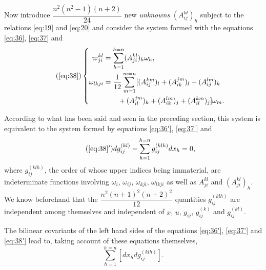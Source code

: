 \documentclass[leqno,12pt]{article}
\theoremstyle{shape1}
\theoremstyle{shape0}
\theoremstyle{shape2}
\theoremstyle{definition}
\begin{document}
Now introduce $\dfrac{n^{2}(n^{2}-1)(n+2)}{24}$ new \emph{unknowns} $(A^{kl}_{ij})_{h}$ subject to the relations \eqref{eq:19} and \eqref{eq:20} and consider the system formed with the equations \eqref{eq:36}, \eqref{eq:37} and
\begin{equation}
  \label{eq:38a}\tag{\ref{eq:38}}
  \left\{
    \begin{aligned}
      \varpi^{kl}_{ji}&=\sum_{h=1}^{h=n}(A^{kl}_{ji})_{h}\omega_{h},\\
      \omega_{lkji}&=\frac{1}{12}\sum_{m=1}^{m=n}[(A^{km}_{ij})_{l}+(A^{jm}_{ik})_{l}+(A^{lm}_{ij})_{k}\\
      &\qquad+(A^{jm}_{il})_{k}+(A^{lm}_{ik})_{j}+(A^{km}_{il})_{j}]\omega_{m}.
    \end{aligned}
  \right.
\end{equation}

According to what has been said and seen in the preceding section, this system is equivalent to the system formed by equations \eqref{eq:36'}, \eqref{eq:37'} and
\begin{equation}
  \label{eq:38'}\tag{\ref{eq:38}$'$}
  dg_{ij}^{(kl)}-\sum_{h=1}^{h=n}g_{ij}^{(klh)}dx_{h}=0,
\end{equation}
where $g_{ij}^{(klh)}$, the order of whose upper indices being immaterial, are indeterminate functions involving $\omega_{i}$, $\omega_{ij}$, $\omega_{kji}$, $\omega_{lkji}$ as well as $A^{kl}_{ji}$ and $(A^{kl}_{ji})_{h}$. We know beforehand that the $\dfrac{n^{2}(n+1)^{2}(n+2)^{2}}{12}$ quantities $g_{ij}^{(klh)}$ are independent among themselves and independent of $x$, $u$, $g_{ij}$, $g_{ij}^{(k)}$ and $g_{ij}^{(kl)}$.

The bilinear covariants of the left hand sides of the equations \eqref{eq:36'}, \eqref{eq:37'} and \eqref{eq:38'} lead to, taking account of these equations themselves,
\[
\sum_{h=1}^{h=n}[dx_{h}dg_{ij}^{(klh)}].
\]
\end{document}
